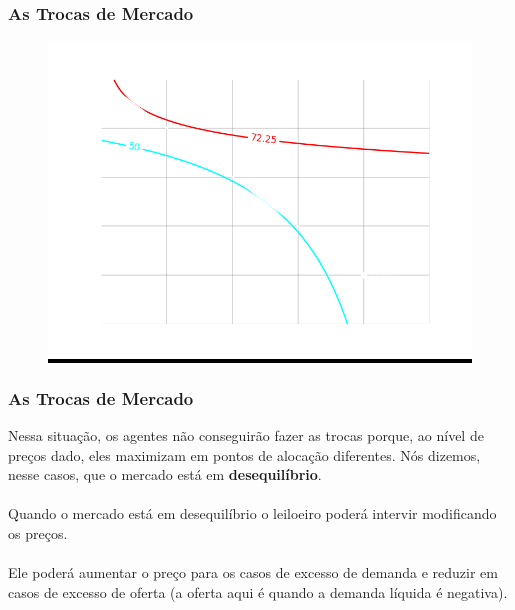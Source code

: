 \documentclass{beamer}[10]
\begin{document}
\begin{frame}
	\frametitle{As Trocas de Mercado}

	\begin{figure}[H]
		\centering
		\colorbox{black}{\includegraphics[scale=0.6]{cap32_4-caixa_edgeworth_3.png}}
	\end{figure}
	
\end{frame}

\begin{frame}
	\frametitle{As Trocas de Mercado}

	Nessa situação, os agentes não conseguirão fazer as trocas porque, ao nível de preços dado, eles maximizam em pontos de alocação diferentes. Nós dizemos, nesse casos, que o mercado está em \textbf{desequilíbrio}.
	\\~\\
	Quando o mercado está em desequilíbrio o leiloeiro poderá intervir modificando os preços. 
	\\~\\
	Ele poderá aumentar o preço para os casos de excesso de demanda e reduzir em casos de excesso de oferta (a oferta aqui é quando a demanda líquida é negativa). 

\end{frame}
\end{document}
